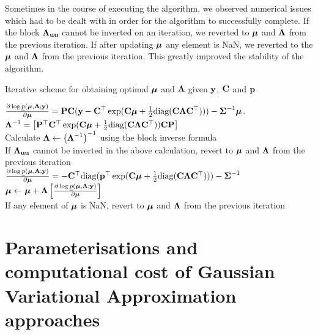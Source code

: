	Sometimes in the course of  executing the algorithm, we observed numerical issues which had to be dealt
	with in order for the algorithm to successfully complete. If the block ${\boldsymbol \Lambda}_{{\bf u} {\bf u}}$ cannot be inverted on an
	iteration, we reverted to ${\boldsymbol \mu}$ and ${\boldsymbol \Lambda}$ from the previous iteration. If after updating ${\boldsymbol \mu}$
	any element is NaN, we reverted to the ${\boldsymbol \mu}$ and ${\boldsymbol \Lambda}$ from the previous iteration. This greatly
	improved the stability of the algorithm.
	
	\begin{algorithm}
		\caption[Algorithm GVA NR]{Iterative scheme for obtaining optimal ${\boldsymbol \mu}$ and ${\boldsymbol \Lambda}$
			given ${\bf y}$, ${\bf C}$ and ${\bf p}$}
		\label{alg:algorithm_nr}
		\begin{algorithmic}
			\REQUIRE $\frac{\partial \log \underline{p}({\boldsymbol \mu}, {\boldsymbol \Lambda}; {\bf y})}{\partial {\boldsymbol\mu}} = {\bf P} {\bf C} ({\bf y} - {\bf C}^\top \exp({\bf C} {\boldsymbol \mu} + \frac{1}{2} \text{diag}{({\bf C}{\boldsymbol\Lambda}{\bf C}^\top)})) - {\boldsymbol \Sigma}^{-1} {\boldsymbol \mu}$.
			\STATE ${\boldsymbol \Lambda}^{-1} = \left [ {\bf P}^\top {\bf C}^\top \exp({\bf C} {\boldsymbol \mu} + \frac{1}{2} \text{diag}({\bf C} {\boldsymbol \Lambda} {\bf C}^\top)) {\bf C} {\bf P} \right ]$ \\ [1ex]
			Calculate \STATE ${\boldsymbol \Lambda} \leftarrow \left ({\boldsymbol \Lambda}^{-1} \right )^{-1}$  using the block inverse formula \\ [1ex]
			If ${\boldsymbol \Lambda}_{{\bf u} {\bf u}}$ cannot be inverted in the above calculation, revert to ${\boldsymbol \mu}$ and ${\boldsymbol \Lambda}$ from the previous iteration \\ [1ex]
			\STATE $\frac{\partial \log \underline{p}({\boldsymbol \mu}, {\boldsymbol \Lambda}; {\bf y})}{\partial {\boldsymbol\mu}} = -{\bf C}^\top \text{diag}({\bf p}^\top \exp({\bf C} {\boldsymbol \mu} + \frac{1}{2} \text{diag}({\bf C} {\boldsymbol \Lambda} {\bf C}^\top))) - {\boldsymbol \Sigma}^{-1}$ \\ [1ex]
			\STATE ${\boldsymbol \mu} \leftarrow {\boldsymbol\mu} + {\boldsymbol \Lambda} \left [ \frac{\partial \log \underline{p}({\boldsymbol \mu}, {\boldsymbol \Lambda}; {\bf y})}{\partial {\boldsymbol\mu}} \right ]$ \\ [1ex]
			If any element of ${\boldsymbol \mu}$ is NaN, revert to ${\boldsymbol \mu}$ and ${\boldsymbol \Lambda}$ from the previous iteration
			\ENDWHILE
		\end{algorithmic}
	\end{algorithm}
			
			
	\section{Parameterisations and computational cost of Gaussian Variational Approximation approaches}
	\label{sec:param}
